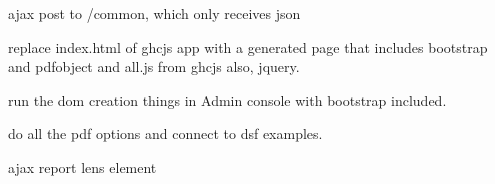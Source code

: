 ajax post to /common, which only receives json


replace index.html of ghcjs app with a generated page that includes bootstrap and pdfobject and all.js from ghcjs
also, jquery.

run the dom creation things in Admin console with bootstrap included.

do all the pdf options and connect to dsf examples.

ajax report lens element

